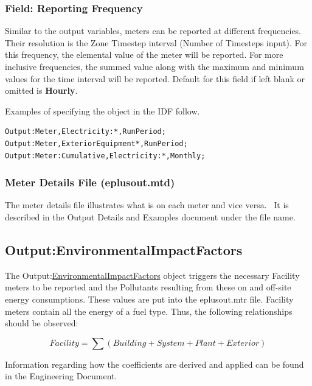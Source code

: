 \subsubsection{Field: Reporting Frequency}\label{field-reporting-frequency-1}

Similar to the output variables, meters can be reported at different frequencies. Their resolution is the Zone Timestep interval (Number of Timesteps input). For this frequency, the elemental value of the meter will be reported. For more inclusive frequencies, the summed value along with the maximum and minimum values for the time interval will be reported. Default for this field if left blank or omitted is \textbf{Hourly}.

Examples of specifying the object in the IDF follow.

\begin{lstlisting}
Output:Meter,Electricity:*,RunPeriod;
Output:Meter,ExteriorEquipment*,RunPeriod;
Output:Meter:Cumulative,Electricity:*,Monthly;
\end{lstlisting}

\subsubsection{Meter Details File (eplusout.mtd)}\label{meter-details-file-eplusout.mtd}

The meter details file illustrates what is on each meter and vice versa.~ It is described in the Output Details and Examples document under the file name.

\subsection{Output:EnvironmentalImpactFactors}\label{outputenvironmentalimpactfactors}

The Output:\hyperref[environmentalimpactfactors]{EnvironmentalImpactFactors} object triggers the necessary Facility meters to be reported and the Pollutants resulting from these on and off-site energy consumptions. These values are put into the eplusout.mtr file. Facility meters contain all the energy of a fuel type. Thus, the following relationships should be observed:

\begin{equation}
Facility = \sum {\left( {Building + System + Plant + Exterior} \right)}
\end{equation}

Information regarding how the coefficients are derived and applied can be found in the Engineering Document.

